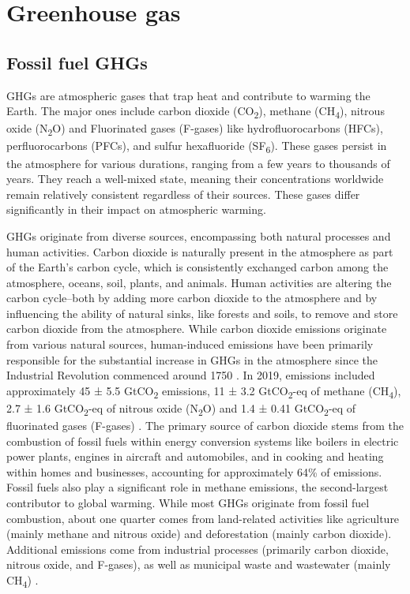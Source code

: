 \section{Greenhouse gas}
\subsection{Fossil fuel GHGs}

GHGs are atmospheric gases that trap heat and contribute to warming the Earth. The major ones include carbon dioxide (CO\textsubscript{2}), methane (CH\textsubscript{4}), nitrous oxide (N\textsubscript{2}O) and Fluorinated gases (F-gases) like hydrofluorocarbons (HFCs), perfluorocarbons (PFCs), and sulfur hexafluoride (SF\textsubscript{6}). These gases persist in the atmosphere for various durations, ranging from a few years to thousands of years. They reach a well-mixed state, meaning their concentrations worldwide remain relatively consistent regardless of their sources. 
These gases differ significantly in their impact on atmospheric warming. \par
GHGs originate from diverse sources, encompassing both natural processes and human activities. Carbon dioxide is naturally present in the atmosphere as part of the Earth's carbon cycle, which is consistently exchanged carbon among the atmosphere, oceans, soil, plants, and animals. Human activities are altering the carbon cycle–both by adding more carbon dioxide to the atmosphere and by influencing the ability of natural sinks, like forests and soils, to remove and store carbon dioxide from the atmosphere. While carbon dioxide emissions originate from various natural sources, human-induced emissions have been primarily responsible for the substantial increase in GHGs in the atmosphere since the Industrial Revolution commenced around 1750 \citep{RN3}. In 2019, emissions included approximately 45 ± 5.5 GtCO\textsubscript{2} emissions, 11 ± 3.2 GtCO\textsubscript{2}-eq of methane (CH\textsubscript{4}), 2.7 ± 1.6 GtCO\textsubscript{2}-eq of nitrous oxide (N\textsubscript{2}O) and 1.4 ± 0.41 GtCO\textsubscript{2}-eq of fluorinated gases (F-gases) \citep{keylist}. The primary source of carbon dioxide stems from the combustion of fossil fuels within energy conversion systems like boilers in electric power plants, engines in aircraft and automobiles, and in cooking and heating within homes and businesses, accounting for approximately 64\% of emissions. Fossil fuels also play a significant role in methane emissions, the second-largest contributor to global warming. While most GHGs originate from fossil fuel combustion, about one quarter comes from land-related activities like agriculture (mainly methane and nitrous oxide) and deforestation (mainly carbon dioxide). Additional emissions come from industrial processes (primarily carbon dioxide, nitrous oxide, and F-gases), as well as municipal waste and wastewater (mainly CH\textsubscript{4}) \citep{keylist}. 
